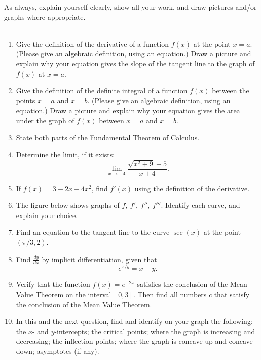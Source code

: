 \documentclass[12pt]{article}
\begin{document}
As always, explain yourself clearly, show all your work, and draw pictures and/or graphs
where appropriate.
\\
\\
\begin{enumerate}[(1)]
\item
Give the definition of the derivative of a function $f(x)$ at the point $x = a$. (Please
give an algebraic definition, using an equation.) Draw a picture and explain why your
equation gives the slope of the tangent line to the graph of $f(x)$ at $x = a$.

\item
Give the definition of the definite integral of a function $f(x)$ between the points $x = a$
and $x = b$. (Please
give an algebraic definition, using an equation.) Draw a picture and explain why your
equation gives the area under the graph of $f(x)$ between $x = a$ and $x = b$.

\item
State both parts of the Fundamental Theorem of Calculus.

\item
Determine the limit, if it exists:
$$\lim_{x \rightarrow -4} \frac{ \sqrt{x^2 + 9} - 5}{x + 4}.$$

\item
If $f(x) = 3 - 2x + 4x^2$, find $f'(x)$ using the definition of the derivative.

\item
The figure below shows graphs of $f, \ f', \ f'', \ f'''$. Identify each curve, and explain
your choice.

\item
Find an equation to the tangent line to the curve $\sec(x)$ at the point $(\pi/3, 2)$.

\item
Find $\frac{dy}{dx}$ by implicit differentiation, given that
$$e^{x/y} = x - y.$$
\newpage
\item
Verify that the function $f(x) = e^{-2x}$ satisfies the conclusion of the Mean Value
Theorem on the interval $[0, 3]$. Then find all numbers $c$ that satisfy the conclusion
of the Mean Value Theorem.

\item
In this and the next question, find and identify on your graph the following:
the $x$- and $y$-intercepts; the critical points; where the graph is increasing and
decreasing; the inflection points; where the graph is concave up and concave down;
asymptotes (if any).


\end{enumerate}
\end{document}
